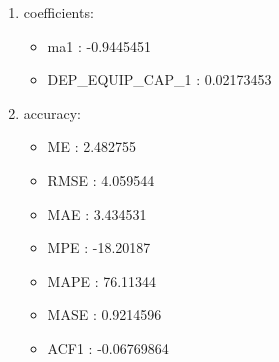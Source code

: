 \documentclass[10pt,a4paper]{article}\usepackage[]{graphicx}\usepackage[]{color}
\newcommand{\AaA}{\_}
\begin{document}
\begin{multicols}{2}
\begin{enumerate}
\item coefficients:
\begin{itemize}
\item  ma1 :  -0.9445451 
\item  DEP\AaA EQUIP\AaA CAP\AaA 1 :  0.02173453 
\end{itemize}
\item accuracy:
\begin{itemize}
\item  ME :  2.482755 
\item  RMSE :  4.059544 
\item  MAE :  3.434531 
\item  MPE :  -18.20187 
\item  MAPE :  76.11344 
\item  MASE :  0.9214596 
\item  ACF1 :  -0.06769864 
\end{itemize}
\end{enumerate}
\end{multicols}
\end{document}

